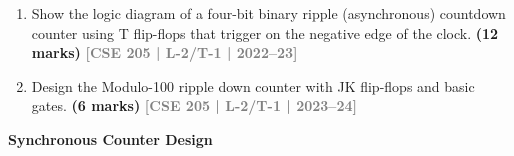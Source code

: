 \documentclass[12pt,a4paper]{article}
\newcommand{\yr}[1]{\hfill\textcolor{gray}{\small\textbf{[#1]}}}
\newcommand{\mk}[1]{\textcolor{orange!70!black}{\small\textbf{(#1 marks)}}}
\newcommand{\subtopic}[2]{%
  \vspace{10pt}
  \noindent\begin{tcolorbox}[colback=#1!8,colframe=#1,boxrule=0.6pt,arc=4pt,
    left=6pt,right=6pt,top=4pt,bottom=4pt]
    \small\bfseries\textcolor{#1}{#2}
  \end{tcolorbox}
  \vspace{2pt}
}
\begin{document}
\begin{enumerate}
\item Show the logic diagram of a four-bit binary ripple (asynchronous) countdown counter using T flip-flops that trigger on the negative edge of the clock.
\mk{12} \yr{CSE 205 | L-2/T-1 | 2022--23}

\item Design the Modulo-100 ripple down counter with JK flip-flops and basic gates.
\mk{6} \yr{CSE 205 | L-2/T-1 | 2023--24}

\end{enumerate}

\subtopic{cG}{Synchronous Counter Design}
\label{sub:s7-sync-counter}
\end{document}
